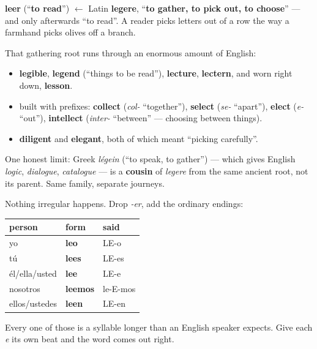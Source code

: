 \begin{cousinweb}
\textbf{leer} (\textquotedblleft{}\textbf{to read}\textquotedblright{}) $\leftarrow$ Latin \textbf{legere}, \textquotedblleft{}\textbf{to gather, to pick out, to choose}\textquotedblright{} — and only afterwards \textquotedblleft{}to read\textquotedblright{}. A reader picks letters out of a row the way a farmhand picks olives off a branch.

That gathering root runs through an enormous amount of English:

\begin{itemize}
\raggedright
  \item \textbf{legible}, \textbf{legend} (\textquotedblleft{}things to be read\textquotedblright{}), \textbf{lecture}, \textbf{lectern}, and worn right down, \textbf{lesson}.
  \item built with prefixes: \textbf{collect} (\emph{col-} \textquotedblleft{}together\textquotedblright{}), \textbf{select} (\emph{se-} \textquotedblleft{}apart\textquotedblright{}), \textbf{elect} (\emph{e-} \textquotedblleft{}out\textquotedblright{}), \textbf{intellect} (\emph{inter-} \textquotedblleft{}between\textquotedblright{} — choosing between things).
  \item \textbf{diligent} and \textbf{elegant}, both of which meant \textquotedblleft{}picking carefully\textquotedblright{}.
\end{itemize}

One honest limit: Greek \emph{légein} (\textquotedblleft{}to speak, to gather\textquotedblright{}) — which gives English \emph{logic}, \emph{dialogue}, \emph{catalogue} — is a \textbf{cousin} of \emph{legere} from the same ancient root, not its parent. Same family, separate journeys.
\end{cousinweb}

\begin{grammarlens}[title={Grammar Lens: a plain -er verb, with a mouthful}]
Nothing irregular happens. Drop \emph{-er}, add the ordinary endings:

\noindent
\begin{tabularx}{\linewidth}{@{}>{\raggedright\arraybackslash}X>{\raggedright\arraybackslash}X>{\raggedright\arraybackslash}X@{}}
\toprule
\textbf{person} & \textbf{form} & \textbf{said} \\
\midrule
yo & \textbf{leo} & LE-o \\
tú & \textbf{lees} & LE-es \\
él/ella/usted & \textbf{lee} & LE-e \\
nosotros & \textbf{leemos} & le-E-mos \\
ellos/ustedes & \textbf{leen} & LE-en \\
\bottomrule
\end{tabularx}

Every one of those is a syllable longer than an English speaker expects. Give each \emph{e} its own beat and the word comes out right.
\end{grammarlens}

